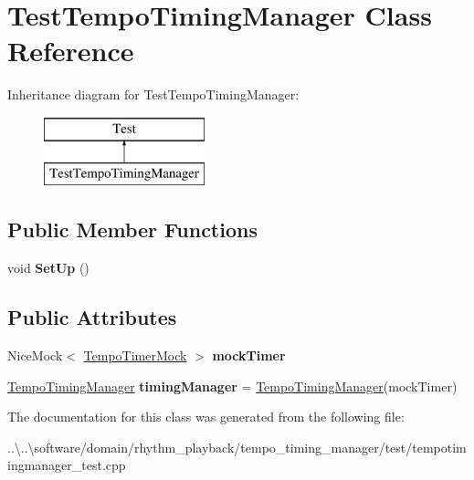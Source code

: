 \hypertarget{class_test_tempo_timing_manager}{}\section{Test\+Tempo\+Timing\+Manager Class Reference}
\label{class_test_tempo_timing_manager}
Inheritance diagram for Test\+Tempo\+Timing\+Manager\+:\begin{figure}[H]
\begin{center}
\leavevmode
\includegraphics[height=2.000000cm]{class_test_tempo_timing_manager}
\end{center}
\end{figure}
\subsection*{Public Member Functions}
\begin{DoxyCompactItemize}
\item 
\mbox{\label{class_test_tempo_timing_manager_ab2dd23b7793242f68e6d4b577f2d46ee}} 
void {\bfseries Set\+Up} ()
\end{DoxyCompactItemize}
\subsection*{Public Attributes}
\begin{DoxyCompactItemize}
\item 
\mbox{\label{class_test_tempo_timing_manager_a9b82197ab9c924bfbcc294e0f8a3d115}} 
Nice\+Mock$<$ \mbox{\hyperlink{class_tempo_timer_mock}{Tempo\+Timer\+Mock}} $>$ {\bfseries mock\+Timer}
\item 
\mbox{\label{class_test_tempo_timing_manager_a270baf608cf066d37fafaf89dd79c8d1}} 
\mbox{\hyperlink{class_tempo_timing_manager}{Tempo\+Timing\+Manager}} {\bfseries timing\+Manager} = \mbox{\hyperlink{class_tempo_timing_manager}{Tempo\+Timing\+Manager}}(mock\+Timer)
\end{DoxyCompactItemize}


The documentation for this class was generated from the following file\+:\begin{DoxyCompactItemize}
\item 
..\textbackslash{}..\textbackslash{}software/domain/rhythm\+\_\+playback/tempo\+\_\+timing\+\_\+manager/test/tempotimingmanager\+\_\+test.\+cpp\end{DoxyCompactItemize}

